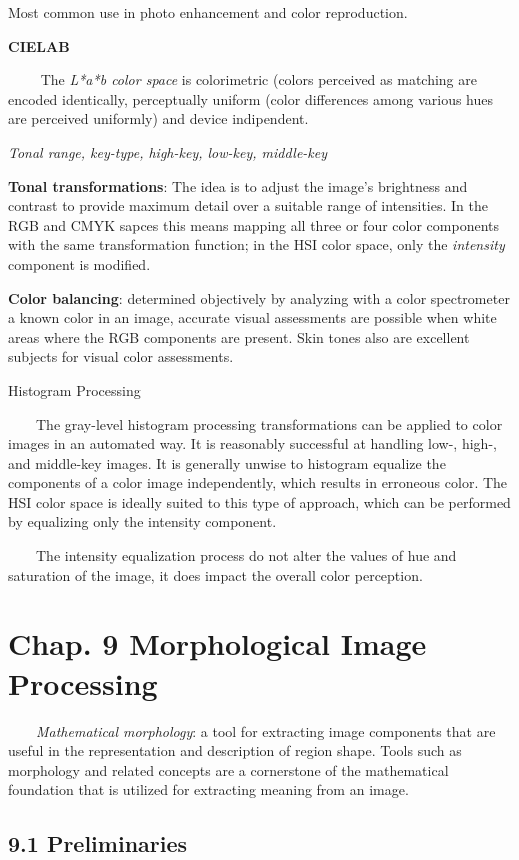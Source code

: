 \documentclass[]{article}
\begin{document}
Most common use in photo enhancement and color reproduction.

\textbf{CIELAB}

\(\quad\quad\) The \emph{L*a*b color space} is colorimetric (colors
perceived as matching are encoded identically, perceptually uniform
(color differences among various hues are perceived uniformly) and
device indipendent.

\emph{Tonal range, key-type, high-key, low-key, middle-key}

\textbf{Tonal transformations}: The idea is to adjust the image's
brightness and contrast to provide maximum detail over a suitable range
of intensities. In the RGB and CMYK sapces this means mapping all three
or four color components with the same transformation function; in the
HSI color space, only the \emph{intensity} component is modified.

\textbf{Color balancing}: determined objectively by analyzing with a
color spectrometer a known color in an image, accurate visual
assessments are possible when white areas where the RGB components are
present. Skin tones also are excellent subjects for visual color
assessments.

Histogram Processing

\(\quad\quad\)The gray-level histogram processing transformations can be
applied to color images in an automated way. It is reasonably successful
at handling low-, high-, and middle-key images. It is generally unwise
to histogram equalize the components of a color image independently,
which results in erroneous color. The HSI color space is ideally suited
to this type of approach, which can be performed by equalizing only the
intensity component.

\(\quad\quad\)The intensity equalization process do not alter the values
of hue and saturation of the image, it does impact the overall color
perception.

\section{Chap. 9 Morphological Image Processing}\label{header-n126}

\(\quad\quad\)\emph{Mathematical morphology}: a tool for extracting
image components that are useful in the representation and description
of region shape. Tools such as morphology and related concepts are a
cornerstone of the mathematical foundation that is utilized for
extracting meaning from an image.

\subsection{9.1 Preliminaries}\label{header-n129}
\end{document}
